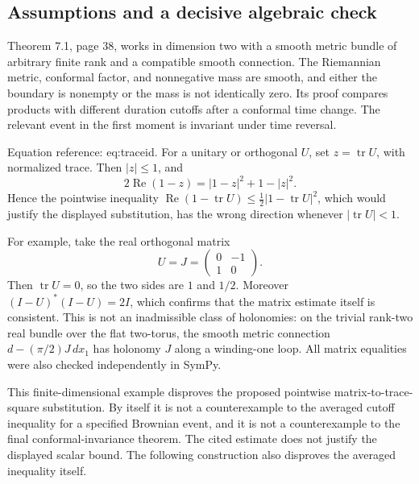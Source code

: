 \documentclass[10pt]{article}
\begin{document}
\subsection*{Assumptions and a decisive algebraic check}
Theorem 7.1, page 38, works in dimension two with a smooth metric bundle of arbitrary finite rank and a compatible smooth connection. The Riemannian metric, conformal factor, and nonnegative mass are smooth, and either the boundary is nonempty or the mass is not identically zero. Its proof compares products with different duration cutoffs after a conformal time change. The relevant event in the first moment is invariant under time reversal.\par
Equation reference: eq:traceid. For a unitary or orthogonal \(U\), set \(z=\operatorname{tr}U\), with normalized trace. Then \(|z|\leq1\), and \[
 2\operatorname{Re}(1-z)
 =|1-z|^2+1-|z|^2.\] Hence the pointwise inequality \(\operatorname{Re}(1-\operatorname{tr}U)\leq\tfrac12|1-\operatorname{tr}U|^2\), which would justify the displayed substitution, has the wrong direction whenever \(|\operatorname{tr}U|<1\).\par
For example, take the real orthogonal matrix \[U=J=\begin{pmatrix}0&-1\\1&0\end{pmatrix}.\] Then \(\operatorname{tr}U=0\), so the two sides are \(1\) and \(1/2\). Moreover \((I-U)^*(I-U)=2I\), which confirms that the matrix estimate itself is consistent. This is not an inadmissible class of holonomies: on the trivial rank-two real bundle over the flat two-torus, the smooth metric connection \(d-(\pi/2)J\,dx_1\) has holonomy \(J\) along a winding-one loop. All matrix equalities were also checked independently in SymPy.\par
This finite-dimensional example disproves the proposed pointwise matrix-to-trace-square substitution. By itself it is not a counterexample to the averaged cutoff inequality for a specified Brownian event, and it is not a counterexample to the final conformal-invariance theorem. The cited estimate does not justify the displayed scalar bound. The following construction also disproves the averaged inequality itself.\par
\end{document}
